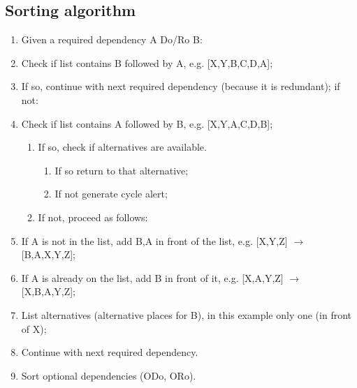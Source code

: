 \subsection{Sorting algorithm}\label{sec:sort}
    \begin{enumerate}
     \item Given a required dependency A Do/Ro B:
     \item Check if list contains B followed by A, e.g. [X,Y,B,C,D,A];
     \item If so, continue with next required dependency (because it is redundant); if not:
     \item Check if list contains A followed by B, e.g. [X,Y,A,C,D,B];
      \begin{enumerate}
       \item If so, check if alternatives are available. 
        \begin{enumerate}
         \item If so return to that alternative; 
         \item If not generate cycle alert;
        \end{enumerate}
        \item If not, proceed as follows:
      \end{enumerate}
     \item If A is not in the list, add B,A in front of the list, e.g. [X,Y,Z] \begin{math} \rightarrow \end{math} [B,A,X,Y,Z];
     \item If A is already on the list, add B in front of it, e.g. [X,A,Y,Z] \begin{math} \rightarrow \end{math} [X,B,A,Y,Z];
     \item List alternatives (alternative places for B), in this example only one (in front of X); 
     \item Continue with next required dependency.
     \item Sort optional dependencies (ODo, ORo).
    \end{enumerate}